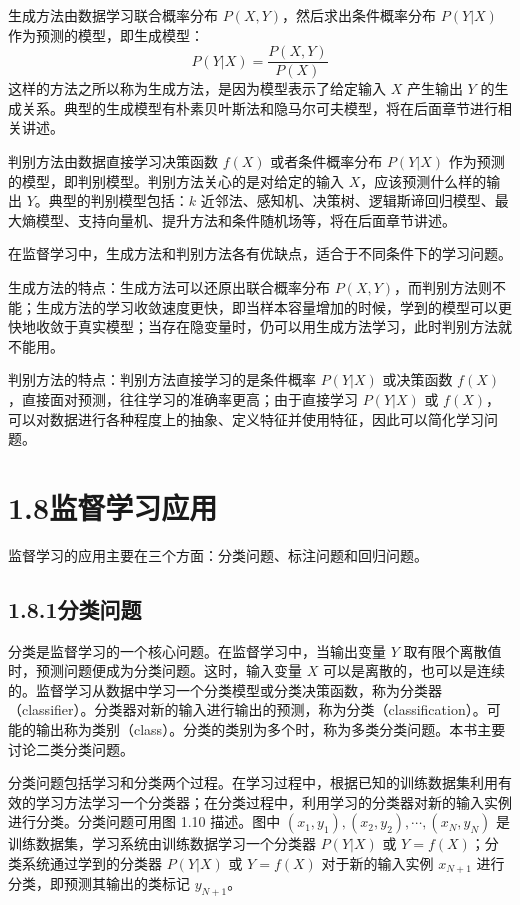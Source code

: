 \documentclass[UTF8,12pt,a4paper,fontset=fandol]{ctexart}
\begin{document}
生成方法由数据学习联合概率分布 $P(X,Y)$，然后求出条件概率分布 $P(Y|X)$ 作为预测的模型，即生成模型：
\begin{equation}
  P(Y|X)=\frac{P(X,Y)}{P(X)}
  \tag{1.40}
\end{equation}
这样的方法之所以称为生成方法，是因为模型表示了给定输入 $X$ 产生输出 $Y$ 的生成关系。典型的生成模型有朴素贝叶斯法和隐马尔可夫模型，将在后面章节进行相关讲述。

判别方法由数据直接学习决策函数 $f(X)$ 或者条件概率分布 $P(Y|X)$ 作为预测的模型，即判别模型。判别方法关心的是对给定的输入 $X$，应该预测什么样的输出 $Y$。典型的判别模型包括：$k$ 近邻法、感知机、决策树、逻辑斯谛回归模型、最大熵模型、支持向量机、提升方法和条件随机场等，将在后面章节讲述。

在监督学习中，生成方法和判别方法各有优缺点，适合于不同条件下的学习问题。

生成方法的特点：生成方法可以还原出联合概率分布 $P(X,Y)$，而判别方法则不能；生成方法的学习收敛速度更快，即当样本容量增加的时候，学到的模型可以更快地收敛于真实模型；当存在隐变量时，仍可以用生成方法学习，此时判别方法就不能用。

判别方法的特点：判别方法直接学习的是条件概率 $P(Y|X)$ 或决策函数 $f(X)$，直接面对预测，往往学习的准确率更高；由于直接学习 $P(Y|X)$ 或 $f(X)$，可以对数据进行各种程度上的抽象、定义特征并使用特征，因此可以简化学习问题。

\section*{1.8\quad 监督学习应用}

监督学习的应用主要在三个方面：分类问题、标注问题和回归问题。

\subsection*{1.8.1\quad 分类问题}

分类是监督学习的一个核心问题。在监督学习中，当输出变量 $Y$ 取有限个离散值时，预测问题便成为分类问题。这时，输入变量 $X$ 可以是离散的，也可以是连续的。监督学习从数据中学习一个分类模型或分类决策函数，称为分类器（classifier）。分类器对新的输入进行输出的预测，称为分类（classification）。可能的输出称为类别（class）。分类的类别为多个时，称为多类分类问题。本书主要讨论二类分类问题。

分类问题包括学习和分类两个过程。在学习过程中，根据已知的训练数据集利用有效的学习方法学习一个分类器；在分类过程中，利用学习的分类器对新的输入实例进行分类。分类问题可用图 1.10 描述。图中 $(x_1,y_1),(x_2,y_2),\cdots,(x_N,y_N)$ 是训练数据集，学习系统由训练数据学习一个分类器 $P(Y|X)$ 或 $Y=f(X)$；分类系统通过学到的分类器 $P(Y|X)$ 或 $Y=f(X)$ 对于新的输入实例 $x_{N+1}$ 进行分类，即预测其输出的类标记 $y_{N+1}$。
\end{document}
